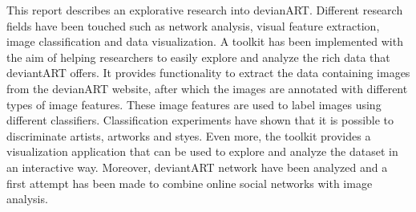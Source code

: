 This report describes an explorative research into devianART. Different research fields have been touched such as network analysis, visual feature extraction, image classification and data visualization.
A toolkit has been implemented with the aim of helping researchers to easily explore and analyze the rich data that deviantART offers. It provides functionality to extract the data containing images from the devianART website, after which the images are annotated with different types of image features. These image features are used to label images using different classifiers. Classification experiments have shown that it is possible to discriminate artists, artworks and styes. Even more, the toolkit provides a visualization application that can be used to explore and analyze the dataset in an interactive way. Moreover, deviantART network have been analyzed and a first attempt has been made to combine online social networks with image analysis.

